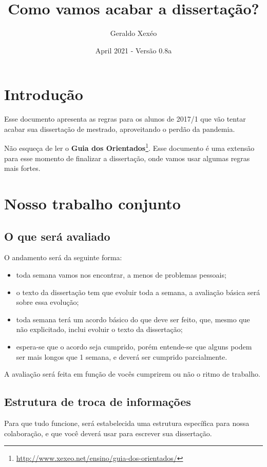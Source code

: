 \documentclass{article}
\title{Como vamos acabar a dissertação?}
\author{Geraldo Xexéo}
\date{April 2021 - Versão 0.8a}
\begin{document}
\maketitle
\tableofcontents
\section{Introdução}

Esse documento apresenta as regras para os alunos de 2017/1 que vão tentar acabar sua dissertação de mestrado, aproveitando o perdão da pandemia.

Não esqueça de ler o \textbf{Guia dos Orientados}\footnote{\url{http://www.xexeo.net/ensino/guia-dos-orientados/}}. Esse documento é uma extensão para esse momento de finalizar a dissertação, onde vamos usar algumas regras mais fortes.

\section{Nosso trabalho conjunto}

\subsection{O que será avaliado}

O andamento será da seguinte forma:
\begin{itemize}
    \item toda semana vamos nos encontrar, a menos de problemas pessoais;
    \item o texto da dissertação tem que evoluir toda a semana, a avaliação básica será sobre essa evolução;
    \item toda semana terá um acordo básico do que deve ser feito, que, mesmo que não explicitado, inclui evoluir o texto da dissertação;
    \item espera-se que o acordo seja cumprido, porém entende-se que alguns podem ser mais longos que 1 semana, e deverá ser cumprido parcialmente.
\end{itemize}

A avaliação  será feita em função de vocês cumprirem ou não o ritmo de trabalho.

\subsection{Estrutura de troca de informações}

Para que tudo funcione, será estabelecida uma estrutura específica para nossa colaboração, e que você deverá usar para escrever sua dissertação.
\end{document}
